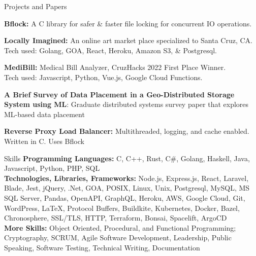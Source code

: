 \documentclass{resume} %
\begin{document}
\begin{rSection}{Projects and Papers}

    {\textbf{Bflock:}} A C library for safer \& faster file locking for concurrent IO operations.

    {\textbf{Locally Imagined:}} An online art market place specialized to Santa Cruz, CA.
    \\ Tech used: Golang, GOA, React, Heroku, Amazon S3, \& Postgresql.
    
    {\textbf{MediBill:}} Medical Bill Analyzer, CruzHacks 2022 First Place Winner.
    \\Tech used: Javascript, Python, Vue.js, Google Cloud Functions.

    {\textbf{A Brief Survey of Data Placement in a Geo-Distributed Storage System using ML}: Graduate distributed systems survey paper that explores ML-based data placement} 

    {\textbf{Reverse Proxy Load Balancer:} } Multithreaded, logging, and cache enabled. Written in C. Uses Bflock
\end{rSection}

\begin{rSection}{Skills}
    {\textbf{Programming Languages:} } C, C++, Rust, C\#, Golang, Haskell, Java, Javascript, Python, PHP, SQL
    \\{\textbf{Technologies, Libraries, Frameworks:} }
    Node.js, Express.js, React, Laravel, Blade, Jest, jQuery, .Net,
    GOA, POSIX, Linux, Unix, Postgresql, MySQL, MS SQL Server, Pandas, OpenAPI,
    GraphQL, Heroku, AWS, Google Cloud, Git, WordPress, LaTeX, Protocol Buffers, Buildkite, Kubernetes, Docker, Bazel, Chronosphere,
    SSL/TLS, HTTP, Terraform, Bonsai, Spacelift, ArgoCD
    \\{\textbf{More Skills:} } Object Oriented, Procedural, and Functional Programming; Cryptography, SCRUM, Agile Software Development, Leadership, Public Speaking, Software Testing, Technical Writing, Documentation
\end{rSection}
    
\end{document}
